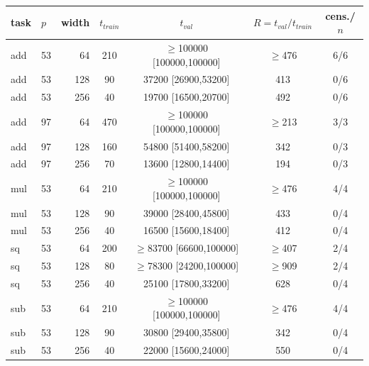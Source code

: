 \begin{tabular}{llrcccc}
\toprule
task & $p$ & width & $t_{train}$ & $t_{val}$ & $R=t_{val}/t_{train}$ & cens./$n$ \\
\midrule
add & 53 & 64 & 210 & $\geq$100000 [100000,100000] & $\geq$476 & 6/6 \\
add & 53 & 128 & 90 & 37200 [26900,53200] & 413 & 0/6 \\
add & 53 & 256 & 40 & 19700 [16500,20700] & 492 & 0/6 \\
add & 97 & 64 & 470 & $\geq$100000 [100000,100000] & $\geq$213 & 3/3 \\
add & 97 & 128 & 160 & 54800 [51400,58200] & 342 & 0/3 \\
add & 97 & 256 & 70 & 13600 [12800,14400] & 194 & 0/3 \\
mul & 53 & 64 & 210 & $\geq$100000 [100000,100000] & $\geq$476 & 4/4 \\
mul & 53 & 128 & 90 & 39000 [28400,45800] & 433 & 0/4 \\
mul & 53 & 256 & 40 & 16500 [15600,18400] & 412 & 0/4 \\
sq & 53 & 64 & 200 & $\geq$83700 [66600,100000] & $\geq$407 & 2/4 \\
sq & 53 & 128 & 80 & $\geq$78300 [24200,100000] & $\geq$909 & 2/4 \\
sq & 53 & 256 & 40 & 25100 [17800,33200] & 628 & 0/4 \\
sub & 53 & 64 & 210 & $\geq$100000 [100000,100000] & $\geq$476 & 4/4 \\
sub & 53 & 128 & 90 & 30800 [29400,35800] & 342 & 0/4 \\
sub & 53 & 256 & 40 & 22000 [15600,24000] & 550 & 0/4 \\
\bottomrule
\end{tabular}